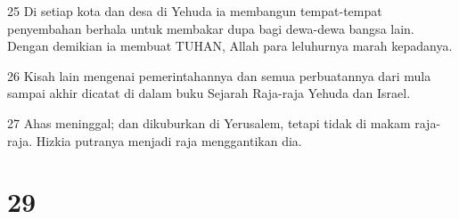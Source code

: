\par 25 Di setiap kota dan desa di Yehuda ia membangun tempat-tempat penyembahan berhala untuk membakar dupa bagi dewa-dewa bangsa lain. Dengan demikian ia membuat TUHAN, Allah para leluhurnya marah kepadanya.
\par 26 Kisah lain mengenai pemerintahannya dan semua perbuatannya dari mula sampai akhir dicatat di dalam buku Sejarah Raja-raja Yehuda dan Israel.
\par 27 Ahas meninggal; dan dikuburkan di Yerusalem, tetapi tidak di makam raja-raja. Hizkia putranya menjadi raja menggantikan dia.

\chapter{29}

